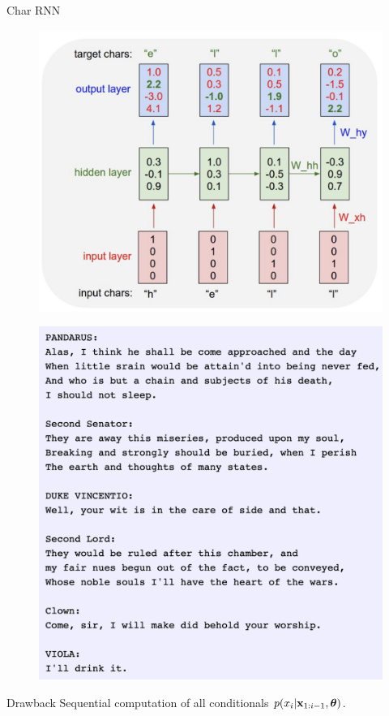 \begin{frame}{Char RNN}
	\begin{minipage}[t]{0.55\columnwidth}
		\begin{figure}[h]
			\centering
			\includegraphics[width=1.0\linewidth]{figs/char_rnn.png}
		\end{figure}
	\end{minipage}%
	\begin{minipage}[t]{0.44\columnwidth}
		\begin{figure}[h]
			\centering
			\includegraphics[width=1.0\linewidth]{figs/char_rnn_output.png}
		\end{figure}
	\end{minipage}
	\begin{block}{Drawback}
	Sequential computation of all conditionals $p(x_i | \mathbf{x}_{1:i-1}, \boldsymbol{\theta})$.
	\end{block}
\end{frame}
